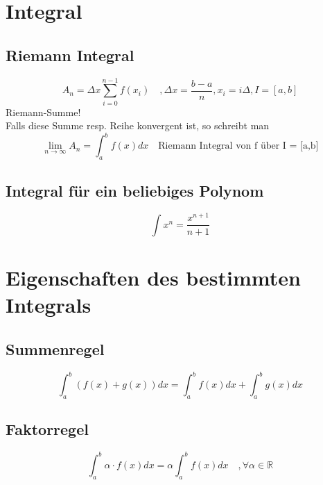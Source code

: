 



\section{Integral}
\subsection{Riemann Integral}
\[ \boxed{A_n = \Delta x \sum_{i=0}^{n-1} f(x_i) \quad 
, \Delta x = \frac{b - a}{n} , x_i = i \Delta , I = [a,b]} \]
Riemann-Summe! \\
Falls diese Summe resp. Reihe konvergent ist, so schreibt man
\[ \boxed{\lim_{n \rightarrow \infty} A_n = \int_{a}^{b} f(x) d x \quad \text{Riemann Integral von f über I = [a,b]} } \]

\subsection{Integral für ein beliebiges Polynom}
\[ \boxed{\int x^n = \frac{x^{n + 1}}{n + 1}} \]

\section{Eigenschaften des bestimmten Integrals}

\subsection{Summenregel}
\[ \boxed{\int_a^b (f(x) + g(x)) dx = \int_a^b f(x) dx + \int_a^b g(x) dx} \]

\subsection{Faktorregel}
\[ \boxed{\int_a^b \alpha \cdot f(x) dx = \alpha \int_a^b f(x) dx \quad , \forall \alpha \in \mathbb{R}} \]

